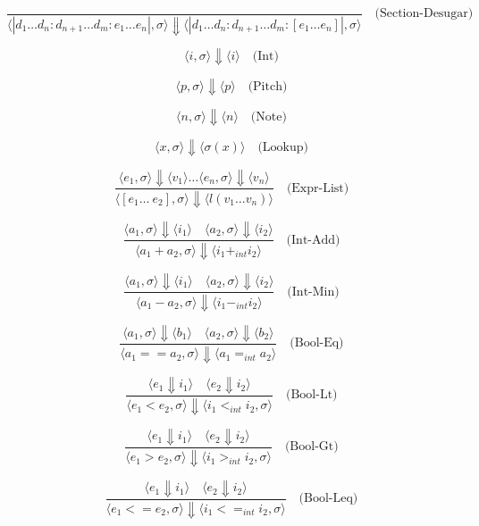 \documentclass[letterpaper,12pt]{article}
\begin{document}
    \[
        \frac{}
            {\langle |d_1 \dots d_n:d_{n+1} \dots d_m:e_1 \dots e_n|, \sigma\rangle \Downarrow \langle |d_1 \dots d_n:d_{n+1} \dots d_m:[e_1 \dots e_n]|, \sigma\rangle} \quad \text{(Section-Desugar)}
        \]
    
    
    \[
    \langle i, \sigma \rangle \Downarrow \langle i \rangle \quad \text{(Int)}
    \]

    \[
    \langle p, \sigma \rangle \Downarrow \langle p \rangle \quad \text{(Pitch)}
    \]

    \[
    \langle n, \sigma \rangle \Downarrow \langle n \rangle \quad \text{(Note)}
    \]
    
    \[
    \langle x, \sigma \rangle \Downarrow \langle \sigma{(x)} \rangle \quad \text{(Lookup)}
    \]

    \[
    \frac{\langle e_1, \sigma \rangle \Downarrow \langle v_1 \rangle \dots \langle e_n, \sigma \rangle \Downarrow \langle v_n \rangle}{\langle [e_1 \dots \ e_2], \sigma \rangle \Downarrow \langle l(v_1 \dots v_n) \rangle} \quad \text{(Expr-List)}
    \]

    \[
    \frac{\langle a_1, \sigma \rangle \Downarrow \langle i_1 \rangle \quad \langle a_2, \sigma \rangle \Downarrow \langle i_2 \rangle}{\langle a_1 + a_2, \sigma \rangle \Downarrow \langle i_1 +_{int} i_2 \rangle} \quad \text{(Int-Add)}
    \]

    \[
    \frac{\langle a_1, \sigma \rangle \Downarrow \langle i_1 \rangle \quad \langle a_2, \sigma \rangle \Downarrow \langle i_2 \rangle}{\langle a_1 - a_2, \sigma \rangle \Downarrow \langle i_1 -_{int} i_2 \rangle} \quad \text{(Int-Min)}
    \]

    \[
    \frac{\langle a_1, \sigma \rangle \Downarrow \langle b_1 \rangle \quad \langle a_2, \sigma \rangle \Downarrow \langle b_2 \rangle}{\langle a_1 == a_2, \sigma \rangle \Downarrow \langle a_1 =_{int} a_2 \rangle} \quad \text{(Bool-Eq)}
    \]

    \[
    \frac{\langle e_1 \Downarrow i_1 \rangle \quad \langle e_2 \Downarrow i_2 \rangle}
    {\langle e_1 < e_2 , \sigma\rangle \Downarrow \langle i_1 <_{int} i_2 , \sigma\rangle}  {} \quad \text{(Bool-Lt)}
    \]
    
    \[
    \frac{\langle e_1 \Downarrow i_1 \rangle \quad \langle e_2 \Downarrow i_2 \rangle}
    {\langle e_1 > e_2 , \sigma\rangle \Downarrow \langle i_1 >_{int} i_2 , \sigma\rangle}  {} \quad \text{(Bool-Gt)}
    \]

    \[
    \frac{\langle e_1 \Downarrow i_1 \rangle \quad \langle e_2 \Downarrow i_2 \rangle}
    {\langle e_1 <= e_2 , \sigma\rangle \Downarrow \langle i_1 <=_{int} i_2 , \sigma\rangle}  {} \quad \text{(Bool-Leq)}
    \]
    
\end{document}
